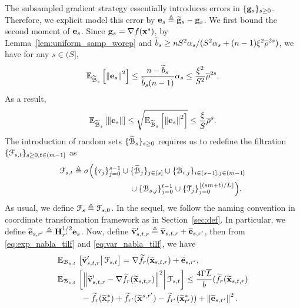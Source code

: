 \documentclass[10pt,twocolumn,journal]{IEEEtran}
\begin{document}
The subsampled gradient strategy essentially introduces errors in $\{\mathbf{g}_s\}_{s\ge 0}$. Therefore, we explicit model this error by $\mathbf{e}_s \triangleq \widetilde{\mathbf{g}}_s - \mathbf{g}_s$. %
We first bound the second moment of $\mathbf{e}_s$. %
Since $\mathbf{g}_s = \nabla f(\mathbf{x}^s)$, by Lemma~\ref{lem:uniform_samp_worep} and $\widetilde{b}_s \ge nS^2\alpha_s/(S^2\alpha_s +(n-1)\xi^2\overline{\rho}^{2s})$, we have for any $s\in(S]$,
\begin{equation}
\mathbb{E}_{\widetilde{\mathcal{B}}_s}\left[\left\Vert\mathbf{e}_s\right\Vert^2\right]\le \frac{n-\widetilde{b}_s}{\widetilde{b}_s(n-1)}\alpha_s\le \frac{\xi^2}{S^2}\overline{\rho}^{2s}. \label{eq:error_2nd_mom}
\end{equation}
As a result, 
\begin{equation}
\mathbb{E}_{\widetilde{\mathcal{B}}_s}\left[\left\Vert\mathbf{e}_s\right\Vert\right] \le \sqrt{\mathbb{E}_{\widetilde{\mathcal{B}}_s}\left[\left\Vert\mathbf{e}_s\right\Vert^2\right]} \le {\frac{\xi}{S}}\overline{\rho}^{s}. \label{eq:error_1st_mom}
\end{equation}
The introduction of random sets $\{\widetilde{\mathcal{B}}_{s}\}_{s\ge 0}$ requires us to redefine the filtration $\{\mathcal{F}_{s,t}\}_{s\ge 0, t\in(m-1]}$ as
\begin{align}
&\calF_{s,t}\defeq \sigma\Big(\{\tau_j\}_{j=0}^{s-1}\cup\{\tilcalB_{j}\}_{j\in (s]}\cup\{\calB_{i,j}\}_{i\in (s-1],j\in(m-1]}\nn\\
&\hspace{3cm}\cup\{\calB_{s,j}\}_{j=0}^{t-1}\cup\{\calT_j\}_{j=0}^{\floor{(sm+t)/L}}\Big).
\end{align}
As usual, we define $\mathcal{F}_s\triangleq \mathcal{F}_{s,0}$. In the sequel, we follow the naming convention in coordinate transformation framework as in Section~\ref{sec:def}. In particular, we define $\widetilde{\mathbf{e}}_{s,r'} \triangleq \mathbf{H}_{r'}^{1/2}\mathbf{e}_{s}$. %
 Now, define $\widetilde{\mathbf{v}}'_{s,t,r} \triangleq \widetilde{\mathbf{v}}_{s,t,r}+\widetilde{\mathbf{e}}_{s,r'}$, then from \eqref{eq:exp_nabla_tilf} and \eqref{eq:var_nabla_tilf}, we have 
\begin{align}
&\mathbb{E}_{\mathcal{B}_{s,t}}\left.\left[\widetilde{\mathbf{v}}'_{s,t,r}\right\vert\mathcal{F}_{s,t}\right] = \nabla \widetilde{f}_r (\widetilde{\mathbf{x}}_{s,t,r}) + \widetilde{\mathbf{e}}_{s,r'},\label{eq:exp_nabla_tilf2}\\
&\mathbb{E}_{\mathcal{B}_{s,t}}\left.\left[\left\Vert\widetilde{\mathbf{v}}'_{s,t,r}-\nabla \widetilde{f}_r(\widetilde{\mathbf{x}}_{s,t,r})\right\Vert^2\right\vert\mathcal{F}_{s,t}\right]\le \frac{4\Gamma\overline{L}}{b}(\widetilde{f}_r(\widetilde{\mathbf{x}}_{s,t,r})\nonumber\\
&\hspace{1cm}-\widetilde{f}_r(\widetilde{\mathbf{x}}_r^*)+\widetilde{f}_{r'}(\widetilde{\mathbf{x}}^{s,{r'}})-\widetilde{f}_{r'}(\widetilde{\mathbf{x}}_{r'}^*)) + \left\Vert\widetilde{\mathbf{e}}_{s,r'}\right\Vert^2.\label{eq:var_nabla_tilf2}
\end{align} 
\end{document}
